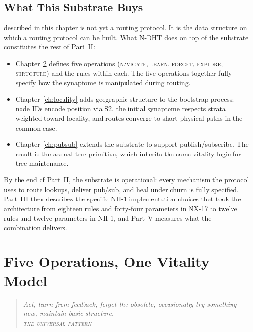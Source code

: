\documentclass[twoside,nobib]{tufte-book}
\newcommand{\NDHT}{N-DHT\xspace}
\begin{document}
\section{What This Substrate Buys}

 described in this chapter is not yet a
routing protocol. It is the data structure on which a routing
protocol can be built. What \NDHT does on top of the substrate
constitutes the rest of Part~II:

\begin{itemize}\setlength\itemsep{0.3em}
  \item Chapter~\ref{ch:operations} defines five operations
    (\textsc{navigate}, \textsc{learn}, \textsc{forget},
    \textsc{explore}, \textsc{structure}) and the rules within
    each. The five operations together fully specify how the
    synaptome is manipulated during routing.
  \item Chapter~\ref{ch:locality} adds geographic structure to the
    bootstrap process: node IDs encode position via S2, the initial
    synaptome respects strata weighted toward locality, and routes
    converge to short physical paths in the common case.
  \item Chapter~\ref{ch:pubsub} extends the substrate to support
    publish/subscribe. The result is the axonal-tree primitive,
    which inherits the same vitality logic for tree maintenance.
\end{itemize}

By the end of Part~II, the substrate is operational: every
mechanism the protocol uses to route lookups, deliver pub/sub, and
heal under churn is fully specified. Part~III then describes the
specific NH-1 implementation choices that took the architecture
from eighteen rules and forty-four parameters in NX-17 to twelve
rules and twelve parameters in NH-1, and Part~V measures what the
combination delivers.


\chapter{Five Operations, One Vitality Model}
\label{ch:operations}

\begin{quote}
  \itshape Act, learn from feedback, forget the obsolete,
  occasionally try something new, maintain basic structure. \\[0.3em]
  \normalfont\textsc{\footnotesize the universal pattern}
\end{quote}
\end{document}
